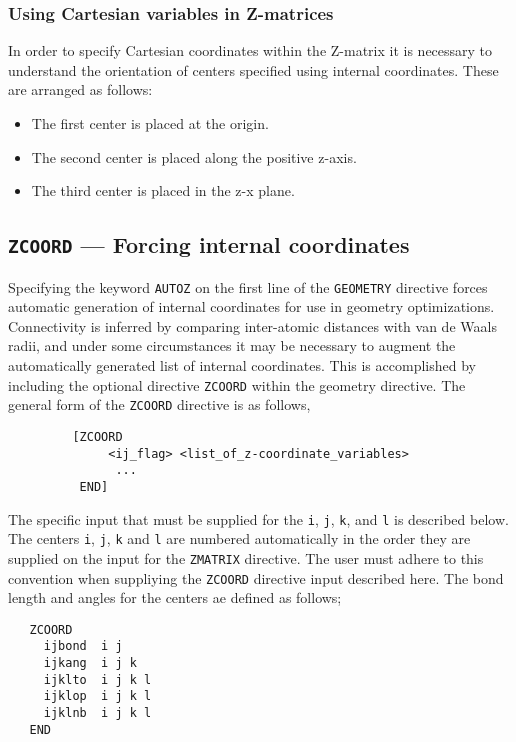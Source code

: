 \subsubsection{Using Cartesian variables in Z-matrices}
\label{sec:zmcart}

In order to specify Cartesian coordinates within the Z-matrix it is
necessary to understand the orientation of centers specified using
internal coordinates.  These are arranged as follows:
\begin{itemize}
\item The first center is placed at the origin.
\item The second center is placed along the positive z-axis.
\item The third center is placed in the z-x plane.
\end{itemize}

\subsection{{\tt ZCOORD} --- Forcing internal coordinates}
\label{sec:zcoord}

Specifying the keyword \verb+AUTOZ+ on the first line of the \verb+GEOMETRY+
directive forces automatic generation of internal
coordinates for use in geometry optimizations.  Connectivity
is inferred by comparing inter-atomic distances with van de Waals
radii, and under some circumstances it may be necessary to augment the
automatically generated list of internal coordinates.  This is
accomplished by including the optional directive {\tt ZCOORD} within the geometry
directive.  The general form of the \verb+ZCOORD+ directive is as follows,
\begin{verbatim}
         [ZCOORD
              <ij_flag> <list_of_z-coordinate_variables>
               ...
          END]
\end{verbatim}

The specific input that must be supplied for the \verb+i+, \verb+j+, \verb+k+, and
\verb+l+ is described below.  The centers 
\verb+i+, \verb+j+, \verb+k+ and \verb+l+ are numbered automatically in the
order they are supplied on the input for the \verb+ZMATRIX+ directive.  The
user must adhere to this convention when suppliying the \verb+ZCOORD+
directive input described here.  The bond length and angles for the centers
ae defined as follows;

\begin{verbatim}
   ZCOORD
     ijbond  i j
     ijkang  i j k
     ijklto  i j k l
     ijklop  i j k l
     ijklnb  i j k l
   END
\end{verbatim}

